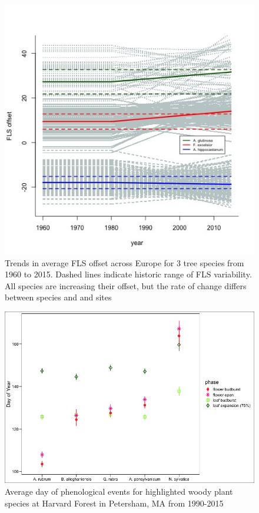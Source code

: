 \documentclass[12pt]{article}\usepackage[]{graphicx}\usepackage[]{color}
\begin{document}
\begin{figure}
    \centering
 \includegraphics[width=\textwidth]{..//figure/FLS_climate_change.jpeg} 
    \caption{Trends in average FLS offset across Europe for 3 tree species from 1960 to 2015. Dashed lines indicate historic range of FLS variability. All species are increasing their offset, but the rate of change differs between species and and sites}
    \label{fig:Figure 1}
\end{figure}
\begin{figure}
    \centering
    \includegraphics[width=\textwidth]{..//figure/HFmeans.jpeg}
    \caption{Average day of phenological events for highlighted woody plant species at Harvard Forest in Petersham, MA from 1990-2015}
    \label{fig:Figure 2}
\end{figure}
\end{document}
